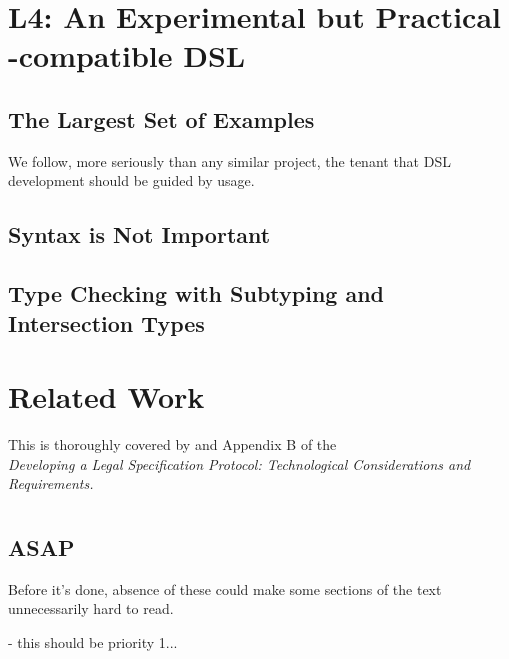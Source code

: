 \documentclass[12pt]{article}
\newcommand{\termz}[2]{\EM{\textsf{\hyperref[#1]{#2}}}\xspace}
\newcommand{\lsm}{\texorpdfstring{\termz{lsm}{CSM}}{CSM}}
\begin{document}
\section{L4: An Experimental but Practical \lsm-compatible DSL}
\subsection{The Largest Set of Examples}
We follow, more seriously than any similar project, the tenant that DSL development should be guided by usage. 

\extlink{}{}

\subsection{Syntax is Not Important}

\subsection{Type Checking with Subtyping and Intersection Types} \label{typechecking}


\section{Related Work}

This is thoroughly covered by  and Appendix B of the \\  {\it Developing a Legal Specification Protocol: Technological Considerations and Requirements.}


\section{\texorpdfstring{}{Dustin's todo}}
\subsection{ASAP}
Before it's done, absence of these could make some sections of the text unnecessarily hard to read.
\begin{LPPI}
\item {} - this should be priority 1...
\item {}
\end{LPPI}
\end{document}
